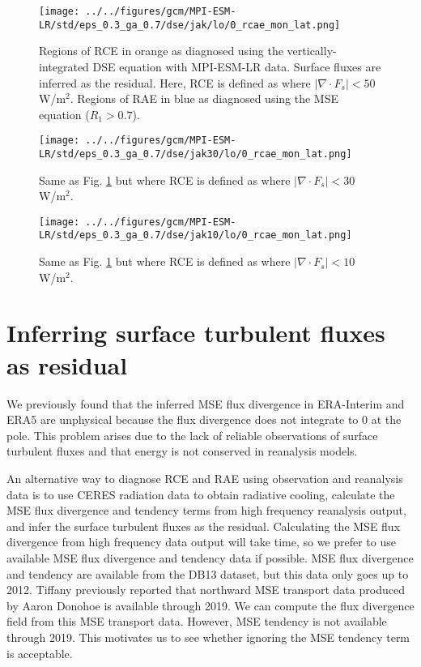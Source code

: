 \documentclass[11pt]{article}
\begin{document}
\begin{figure}[htbp]
\centering
\texttt{[image: ../../figures/gcm/MPI-ESM-LR/std/eps\_0.3\_ga\_0.7/dse/jak/lo/0\_rcae\_mon\_lat.png]}
\caption{\label{fig:org5bcf633}Regions of RCE in orange as diagnosed using the vertically-integrated DSE equation with MPI-ESM-LR data. Surface fluxes are inferred as the residual. Here, RCE is defined as where \(|\nabla\cdot F_s| < 50\) W/m\(^2\). Regions of RAE in blue as diagnosed using the MSE equation (\(R_1>0.7\)).}
\end{figure}

\begin{figure}[htbp]
\centering
\texttt{[image: ../../figures/gcm/MPI-ESM-LR/std/eps\_0.3\_ga\_0.7/dse/jak30/lo/0\_rcae\_mon\_lat.png]}
\caption{\label{fig:org99dcb89}Same as Fig. \ref{fig:org5bcf633} but where RCE is defined as where \(|\nabla\cdot F_s| < 30\) W/m\(^2\).}
\end{figure}

\begin{figure}[htbp]
\centering
\texttt{[image: ../../figures/gcm/MPI-ESM-LR/std/eps\_0.3\_ga\_0.7/dse/jak10/lo/0\_rcae\_mon\_lat.png]}
\caption{\label{fig:orgcf86695}Same as Fig. \ref{fig:org5bcf633} but where RCE is defined as where \(|\nabla\cdot F_s| < 10\) W/m\(^2\).}
\end{figure}

\section{Inferring surface turbulent fluxes as residual}
\label{sec:orga4e0468}
We previously found that the inferred MSE flux divergence in ERA-Interim and ERA5 are unphysical because the flux divergence does not integrate to 0 at the pole. This problem arises due to the lack of reliable observations of surface turbulent fluxes and that energy is not conserved in reanalysis models.

An alternative way to diagnose RCE and RAE using observation and reanalysis data is to use CERES radiation data to obtain radiative cooling, calculate the MSE flux divergence and tendency terms from high frequency reanalysis output, and infer the surface turbulent fluxes as the residual. Calculating the MSE flux divergence from high frequency data output will take time, so we prefer to use available MSE flux divergence and tendency data if possible. MSE flux divergence and tendency are available from the DB13 dataset, but this data only goes up to 2012. Tiffany previously reported that northward MSE transport data produced by Aaron Donohoe is available through 2019. We can compute the flux divergence field from this MSE transport data. However, MSE tendency is not available through 2019. This motivates us to see whether ignoring the MSE tendency term is acceptable.
\end{document}
